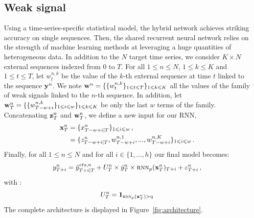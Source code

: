\documentclass{article} %
\newcommand{\ts}{y}
\newcommand{\fullts}{{\bf \ts}}
\newcommand{\tspred}{\hat{\ts}}
\newcommand{\lag}{h}
\newcommand{\window}{w}
\newcommand{\etspred}{\hat{y}}
\newcommand{\meants}{\Bar{\ts}}
\newcommand{\rnnwindow}{{\bf \rnn}}
\newcommand{\rnn}{z}
\newcommand{\rnnmodel}{\textsc{rnn}}
\newcommand{\ws}{w}
\newcommand{\fullws}{{\bf \ws}}
\newcommand{\concatinput}{x}
\newcommand{\fullconcatinput}{{ \bf \concatinput}}
\newcommand{\threshold}{\eta}
\begin{document}
\subsection{Weak signal}

Using a time-series-specific statistical model, the hybrid network achieves striking accuracy on single sequences. Then, the shared recurrent neural network relies on the strength of machine learning methods at leveraging a huge quantities of heterogeneous data.
In addition to the $N$ target time series, we consider $K \times N$ external sequences indexed from $0$ to $T$. For all $1\leqslant n \leqslant N$, $1\leqslant k \leqslant K$ and  $1\leqslant t \leqslant T$, let $\ws^{n,k}_t$ be the value of the $k$-th external sequence at time $t$ linked to the sequence $\fullts^n$. We note $\fullws^n = \{\{\ws_t^{n,k}\}_{1\leqslant t \leqslant T}\}_{1\leqslant k \leqslant K}$ all the values of the family of weak signals linked to the $n$-th sequence. In addition, let $\fullws^n_T = \{\{\ws_{T-w+i}^{n,k}\}_{1\leqslant i \leqslant \window}\}_{1\leqslant k \leqslant K}$ be only the last $\window$ terms of the family. Concatenating $ \rnnwindow^n_T$ and $\fullws^n_T$, we define a new input for our RNN,   
\begin{align*}
\fullconcatinput^n_T &= \{\concatinput^n_{T-w+i|T}\}_{1\leqslant i \leqslant w}\,, \\
&= \{\rnn^n_{T-w+i|T}, \ws^{n,1}_{T-w+i},...,\ws^{n,K}_{T-w+i}\}_{1\leqslant i \leqslant w}\,.
\end{align*}
Finally, for all $1\leqslant n \leqslant N$ and for all $i \in \{1,\ldots,\lag\}$ our final model becomes:
\begin{equation}
\label{eq:full:model}
\ts^n_{T+i}  = \etspred^{ets,n}_{T+i|T} +  U^n_T\times\meants^n_T\times \rnnmodel_p(\fullconcatinput^n_T)_{T+i} + \varepsilon^n_{T+i}\,,
\end{equation}
with :
\begin{align*}
U^n_T = \mathbf{1}_{\rnnmodel_p(\fullconcatinput^n_T) > \threshold}
\end{align*}
The complete architecture is displayed in Figure~\ref{fig:architecture}.
\end{document}
